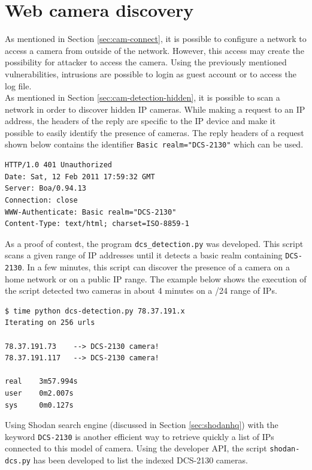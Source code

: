 \section{Web camera discovery}
\label{sec:dcs-web-access}

As mentioned in Section \ref{sec:cam-connect}, it is possible to configure a network to access a camera from outside of the network.
However, this access may create the possibility for attacker to access the camera.
Using the previously mentioned vulnerabilities, intrusions are possible to login as guest account or to access the log file.\\

As mentioned in Section \ref{sec:cam-detection-hidden}, it is possible to scan a network in order to discover hidden IP cameras.
While making a request to an IP address, the headers of the reply are specific to the IP device and make it possible to easily identify the presence of cameras.
The reply headers of a request shown below contains the identifier \texttt{Basic realm="DCS-2130"} which can be used.

{\scriptsize
\begin{verbatim}
HTTP/1.0 401 Unauthorized
Date: Sat, 12 Feb 2011 17:59:32 GMT
Server: Boa/0.94.13
Connection: close
WWW-Authenticate: Basic realm="DCS-2130"
Content-Type: text/html; charset=ISO-8859-1
\end{verbatim}
}

As a proof of contest, the program \texttt{dcs\_detection.py} was developed.
This script scans a given range of IP addresses until it detects a basic realm containing \texttt{DCS-2130}.
In a few minutes, this script can discover the presence of a camera on a home network or on a public IP range.
The example below shows the execution of the script detected two cameras in about 4 minutes on a /24 range of IPs.\\

{\scriptsize
\begin{verbatim}
$ time python dcs-detection.py 78.37.191.x
Iterating on 256 urls

78.37.191.73    --> DCS-2130 camera!
78.37.191.117   --> DCS-2130 camera!

real    3m57.994s
user    0m2.007s
sys     0m0.127s
\end{verbatim}
}

Using Shodan search engine (discussed in Section \ref{sec:shodanhq}) with the keyword \texttt{DCS-2130} is another efficient way to retrieve quickly a list of IPs connected to this model of camera.
Using the developer API, the script \texttt{shodan-dcs.py} has been developed to list the indexed DCS-2130 cameras.\\

